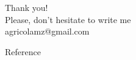 \section{}
\begin{frame}
{\huge Thank you!\bigskip\\
\normalsize Please, don't hesitate to write me\\
agricolamz@gmail.com
\vspace{-130pt}}
\end{frame}
\begin{frame}{Reference}
\footnotesize


\end{frame}

